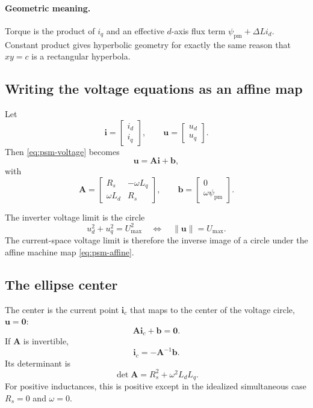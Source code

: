 \documentclass[11pt,a4paper]{article}
\newcommand{\id}{i_d}
\newcommand{\iq}{i_q}
\newcommand{\Rs}{R_s}
\newcommand{\Ld}{L_d}
\newcommand{\Lq}{L_q}
\newcommand{\psipm}{\psi_{\mathrm{pm}}}
\newcommand{\w}{\omega}
\newcommand{\Umax}{U_{\max}}
\newcommand{\vct}[1]{\bm{#1}}
\newcommand{\mat}[1]{\bm{#1}}
\begin{document}
\paragraph{Geometric meaning.}
Torque is the product of $\iq$ and an effective $d$-axis flux term $\psipm+\Delta L\id$. Constant product gives hyperbolic geometry for exactly the same reason that $xy=c$ is a rectangular hyperbola.

\subsection{Writing the voltage equations as an affine map}

Let
\begin{equation}
  \vct i=\begin{bmatrix}\id\\\iq\end{bmatrix},
  \qquad
  \vct u=\begin{bmatrix}u_d\\u_q\end{bmatrix}.
\end{equation}
Then \eqref{eq:psm-voltage} becomes
\begin{equation}
  \vct u=\mat A\vct i+\vct b,
  \label{eq:psm-affine}
\end{equation}
with
\begin{equation}
  \mat A=
  \begin{bmatrix}
  \Rs&-\w\Lq\\
  \w\Ld&\Rs
  \end{bmatrix},
  \qquad
  \vct b=
  \begin{bmatrix}
  0\\\w\psipm
  \end{bmatrix}.
  \label{eq:psm-A-b}
\end{equation}

The inverter voltage limit is the circle
\begin{equation}
  u_d^2+u_q^2=\Umax^2
  \quad\Longleftrightarrow\quad
  \|\vct u\|=\Umax.
  \label{eq:voltage-circle}
\end{equation}
The current-space voltage limit is therefore the inverse image of a circle under the affine machine map \eqref{eq:psm-affine}.

\subsection{The ellipse center}

The center is the current point $\vct i_c$ that maps to the center of the voltage circle, $\vct u=\vct 0$:
\begin{equation}
  \mat A\vct i_c+\vct b=\vct0.
\end{equation}
If $\mat A$ is invertible,
\begin{equation}
  \vct i_c=-\mat A^{-1}\vct b.
\end{equation}
Its determinant is
\begin{equation}
  \det\mat A=\Rs^2+\w^2\Ld\Lq.
  \label{eq:detA-psm}
\end{equation}
For positive inductances, this is positive except in the idealized simultaneous case $\Rs=0$ and $\omega=0$.
\end{document}
